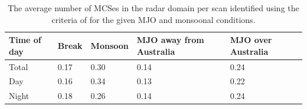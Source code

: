 \documentclass[journal abbreviation, manuscript]{copernicus}
\begin{document}













\clearpage
\begin{table}
\centering
\caption{The average number of MCSes in the radar domain per scan identified using the criteria of \citep{Roweetal2013} for the given MJO and monsoonal conditions.}
\begin{tabular}{|l|l|l|l|l|} 
\hline
\textbf{Time of day} & Break & Monsoon & MJO away from Australia & MJO over Australia  \\ 
\hline
Total                & 0.17  & 0.30    & 0.14                    & 0.24                \\ 
\hline
Day                  & 0.16  & 0.34    & 0.13                    & 0.22                \\ 
\hline
Night                & 0.18  & 0.26    & 0.14                    & 0.24                \\
\hline
\end{tabular}
\label{table:mcs_count}
\end{table}
\end{document}
